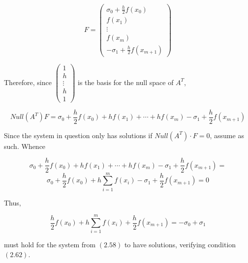 \begin{solution}
    $$F=\left(\begin{array}{c} \sigma_0+\frac{h}{2}f(x_0) \\ f(x_1) \\ \vdots \\ f(x_m) 
                           \\ -\sigma_1+\frac{h}{2}f(x_{m+1}) \end{array}\right)$$
                           
    Therefore, since $\left(\begin{array}{c} 1\\ h\\ \vdots\\ h\\ 1 \end{array}\right)$ is the basis for
    the null space of $A^T$,
    
    $$Null(A^T) F=\sigma_0+\frac{h}{2}f(x_0)+hf(x_1)+\cdots+hf(x_m)-\sigma_1+\frac{h}{2}f(x_{m+1})$$
    
    Since the system in question only has solutions if $Null(A^T)\cdot F=0$, assume as such. Whence
    
    $$\sigma_0+\frac{h}{2}f(x_0)+hf(x_1)+\cdots+hf(x_m)-\sigma_1+\frac{h}{2}f(x_{m+1})=$$
    $$\sigma_0+\frac{h}{2}f(x_0)+h\sum_{i=1}^mf(x_i)-\sigma_1+\frac{h}{2}f(x_{m+1})=0$$
    
    Thus,
    
    $$\frac{h}{2}f(x_0)+h\sum_{i=1}^mf(x_i)+\frac{h}{2}f(x_{m+1})=-\sigma_0+\sigma_1$$
    
    must hold for the system from $(2.58)$ to have solutions, verifying condition $(2.62)$.


\end{solution}